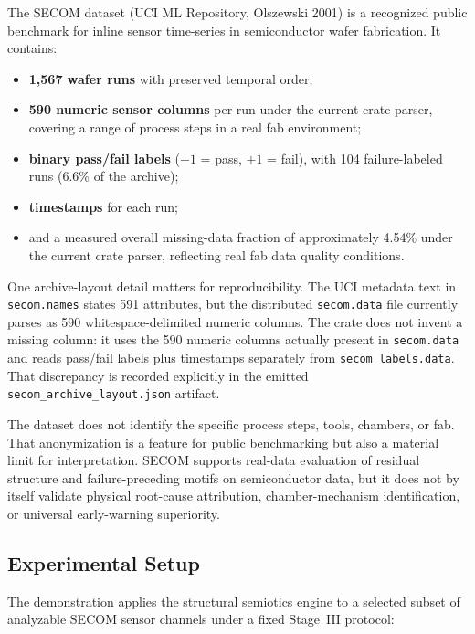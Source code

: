 \documentclass[11pt,letterpaper]{article}
\theoremstyle{scresult}
\begin{document}
The SECOM dataset (UCI ML Repository, Olszewski 2001) is a recognized public
benchmark for inline sensor time-series in semiconductor wafer fabrication.
It contains:
\begin{itemize}
  \item \textbf{1,567 wafer runs} with preserved temporal order;
  \item \textbf{590 numeric sensor columns} per run under the current crate
        parser, covering a
        range of process steps in a real fab environment;
  \item \textbf{binary pass/fail labels} ($-1$ = pass, $+1$ = fail), with
        104 failure-labeled runs (6.6\% of the archive);
  \item \textbf{timestamps} for each run;
  \item and a measured overall missing-data fraction of approximately 4.54\%
        under the current crate parser, reflecting real fab data quality
        conditions.
\end{itemize}

One archive-layout detail matters for reproducibility. The UCI metadata text in
\texttt{secom.names} states 591 attributes, but the distributed
\texttt{secom.data} file currently parses as 590 whitespace-delimited numeric
columns. The crate does not invent a missing column: it uses the 590 numeric
columns actually present in \texttt{secom.data} and reads pass/fail labels plus
timestamps separately from \texttt{secom\_labels.data}. That discrepancy is
recorded explicitly in the emitted \texttt{secom\_archive\_layout.json}
artifact.

The dataset does not identify the specific process steps, tools, chambers, or
fab. That anonymization is a feature for public benchmarking but also a
material limit for interpretation. SECOM supports real-data evaluation of
residual structure and failure-preceding motifs on semiconductor data, but it
does not by itself validate physical root-cause attribution, chamber-mechanism
identification, or universal early-warning superiority.

\subsection{Experimental Setup}

The demonstration applies the structural semiotics engine to a selected subset
of analyzable SECOM sensor channels under a fixed Stage~III protocol:
\end{document}
